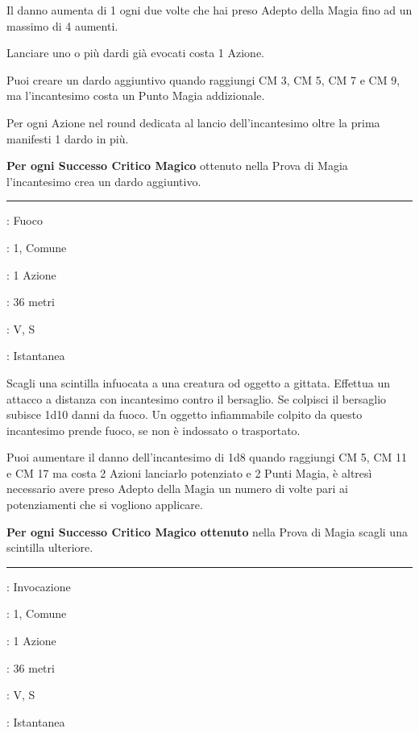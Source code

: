 \begin{multicols}{2}
Il danno aumenta di 1 ogni due volte che hai preso Adepto della Magia fino ad un massimo di 4 aumenti.

Lanciare uno o più dardi già evocati costa 1 Azione.

Puoi creare un dardo aggiuntivo quando raggiungi CM 3, CM 5, CM 7 e CM 9, ma l'incantesimo costa un Punto Magia addizionale.

Per ogni Azione nel round dedicata al lancio dell'incantesimo oltre la prima manifesti 1 dardo in più.

\textbf{Per ogni Successo Critico Magico} ottenuto nella Prova di Magia l'incantesimo crea un dardo aggiuntivo.

\smallskip\noindent\rule{\linewidth}{2pt} \hypertarget{Dardo di Fuoco}{}\smallskip{}
\noindent
\begin{description}[noitemsep, topsep=0pt, parsep=0pt, partopsep=0pt, leftmargin=0cm, labelwidth=2.8cm]
	\item[\textbf{Lista di Magia}]: Fuoco
	\item[\textbf{Livello}]: 1, Comune
	\item[\textbf{T. di Lancio}]: 1 Azione
	\item[\textbf{Gittata}]: 36 metri
	\item[\textbf{Componenti}]: V, S
	\item[\textbf{Durata}]: Istantanea
\end{description}

Scagli una scintilla infuocata a una creatura od oggetto a gittata. Effettua un attacco a distanza con incantesimo contro il bersaglio. Se colpisci il bersaglio subisce 1d10 danni da fuoco. Un oggetto infiammabile colpito da questo incantesimo prende fuoco, se non è indossato o trasportato.

Puoi aumentare il danno dell'incantesimo di 1d8 quando raggiungi CM 5, CM 11 e CM 17 ma costa 2 Azioni lanciarlo potenziato e 2 Punti Magia, è altresì necessario avere preso Adepto della Magia un numero di volte pari ai potenziamenti che si vogliono applicare.

\textbf{Per ogni Successo Critico Magico ottenuto} nella Prova di Magia scagli una scintilla ulteriore.

\smallskip\noindent\rule{\linewidth}{2pt} \hypertarget{Dardo occulto}{}\smallskip{}
\noindent
\begin{description}[noitemsep, topsep=0pt, parsep=0pt, partopsep=0pt, leftmargin=0cm, labelwidth=2.8cm]
	\item[\textbf{Lista di Magia}]: Invocazione
	\item[\textbf{Livello}]: 1, Comune
	\item[\textbf{T. di Lancio}]: 1 Azione
	\item[\textbf{Gittata}]: 36 metri
	\item[\textbf{Componenti}]: V, S
	\item[\textbf{Durata}]: Istantanea
\end{description}


\end{multicols}

